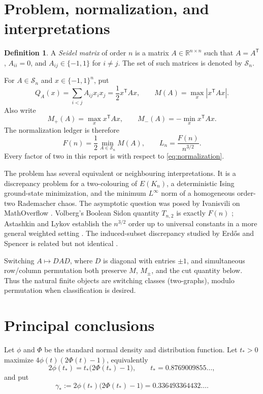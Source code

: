 \documentclass[11pt]{article}
\theoremstyle{definition}
\newtheorem{definition}[theorem]{Definition}
\theoremstyle{remark}
\newcommand{\Sn}{\mathcal S_n}
\newcommand{\R}{\mathbb R}
\begin{document}
\tableofcontents

\section{Problem, normalization, and interpretations}

\begin{definition}
A \emph{Seidel matrix} of order $n$ is a matrix $A\in\R^{n\times n}$ such that
$A=A^{\mathsf T}$, $A_{ii}=0$, and $A_{ij}\in\{-1,1\}$ for $i\ne j$.
The set of such matrices is denoted by $\Sn$.
\end{definition}

For $A\in\Sn$ and $x\in\{-1,1\}^n$, put
\[
 Q_A(x)=\sum_{i<j}A_{ij}x_ix_j=\frac12x^{\mathsf T}Ax,
 \qquad
 M(A)=\max_x|x^{\mathsf T}Ax|.
\]
Also write
\[
 M_+(A)=\max_xx^{\mathsf T}Ax,
 \qquad
 M_-(A)=-\min_xx^{\mathsf T}Ax.
\]
The normalization ledger is therefore
\begin{equation}\label{eq:normalization}
 F(n)=\frac12\min_{A\in\Sn}M(A),
 \qquad L_n=\frac{F(n)}{n^{3/2}}.
\end{equation}
Every factor of two in this report is with respect to
\eqref{eq:normalization}.

The problem has several equivalent or neighbouring interpretations.
It is a discrepancy problem for a two-colouring of $E(K_n)$, a deterministic
Ising ground-state minimization, and the minimum $L^\infty$ norm of a
 homogeneous order-two Rademacher chaos.  The asymptotic question was posed by
 Ivanisvili on MathOverflow \cite{ivanisvili}.  Volberg's Boolean Sidon quantity
$T_{n,2}$ is exactly $F(n)$ \cite{volberg}; Astashkin and Lykov establish the
$n^{3/2}$ order up to universal constants in a more general weighted setting
\cite{astashkin-lykov}.  The induced-subset discrepancy studied by
Erd\H{o}s and Spencer is related but not identical \cite{erdos-spencer}.

Switching $A\mapsto DAD$, where $D$ is diagonal with entries $\pm1$, and
simultaneous row/column permutation both preserve $M$, $M_\pm$, and the cut
quantity below.  Thus the natural finite objects are switching classes
(two-graphs), modulo permutation when classification is desired.

\section{Principal conclusions}

Let $\phi$ and $\Phi$ be the standard normal density and distribution
function.  Let $t_*>0$ maximize
$4\phi(t)(2\Phi(t)-1)$, equivalently
\[
 2\phi(t_*)=t_*\bigl(2\Phi(t_*)-1\bigr),
 \qquad t_*=0.8769009855\ldots,
\]
and put
\[
 \gamma_*:=2\phi(t_*)\bigl(2\Phi(t_*)-1\bigr)
 =0.336493364432\ldots .
\]
\end{document}
